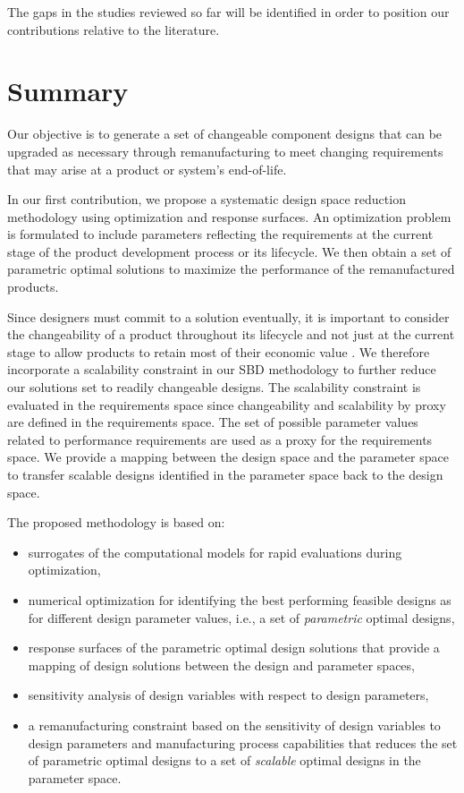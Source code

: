 The gaps in the studies reviewed so far will be identified in order to position our contributions relative to the literature.

\section{Summary}
\label{sec:bgsummary}

Our objective is to generate a set of changeable component designs that can be upgraded as necessary through remanufacturing to meet changing requirements that may arise at a product or system's end-of-life. 

In our first contribution, we propose a systematic design space reduction methodology using optimization and response surfaces. An optimization problem is formulated to include parameters reflecting the requirements at the current stage of the product development process or its lifecycle. We then obtain a set of parametric optimal solutions to maximize the performance of the remanufactured products. 

Since designers must commit to a solution eventually, it is important to consider the {changeability} of a product throughout its lifecycle and not just at the current stage to allow products to retain most of their economic value \cite{Fricke2005}. We therefore incorporate a scalability constraint in our \ac{SBD} methodology to further reduce our solutions set to readily changeable designs. The scalability constraint is evaluated in the requirements space since changeability and scalability by proxy are defined in the requirements space. The set of possible parameter values related to performance requirements are used as a proxy for the requirements space. We provide a mapping between the design space and the parameter space to transfer scalable designs identified in the parameter space back to the design space.

The proposed methodology is based on:
\begin{itemize}
	\item surrogates of the computational models for rapid evaluations during optimization,
	\item numerical optimization for identifying the best performing feasible designs as for different design parameter values, i.e., a set of \textit{parametric} optimal designs,%
	\item response surfaces of the parametric optimal design solutions that provide a mapping of design solutions between the design and parameter spaces,
	\item sensitivity analysis of design variables with respect to design parameters,
	\item a remanufacturing constraint based on the sensitivity of design variables to design parameters and manufacturing process capabilities that reduces the set of parametric optimal designs to a set of \textit{scalable} optimal designs in the parameter space.
\end{itemize}

